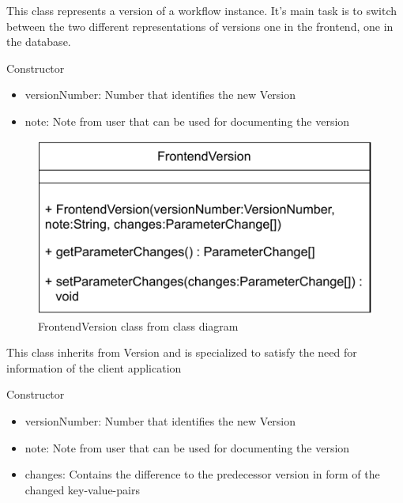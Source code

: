 This class represents a version of a workflow instance. It's main task is to switch between the two different representations of versions one in the frontend, one in the database.
\begin{methodenv}{Constructor}



\begin{itemize}
	\item{versionNumber:}
	Number that identifies the new Version
	\item{note:}
	Note from user that can be used for documenting the version
\end{itemize}
\end{methodenv}

\begin{figure}[h]
\centerline{\includegraphics[scale=1]{res/Klassen/FrontendVersion.pdf}}
\caption{FrontendVersion class from class diagram}
\end{figure}

This class inherits from Version and is specialized to satisfy the need for information of the client application
\begin{methodenv}{Constructor}



\begin{itemize}
	\item{versionNumber:}
	Number that identifies the new Version
	\item{note:}
	Note from user that can be used for documenting the version
	\item{changes:}
	Contains the difference to the predecessor version in form of the changed key-value-pairs
\end{itemize}
\end{methodenv}

